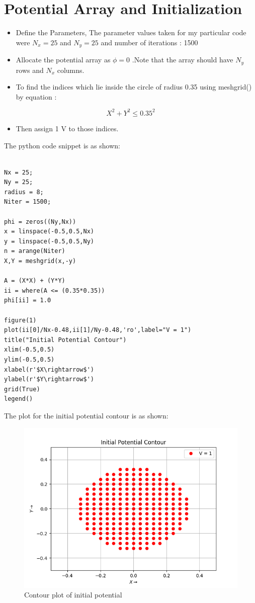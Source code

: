 \documentclass[11pt, a4paper]{article}
\begin{document}
  \section{Potential Array and Initialization}
  

\begin{itemize}
\item
  Define the Parameters, The parameter values taken for my particular code 		  were \(N_x = 25\) and \(N_y = 25\) and number of iterations : 1500
\item
  Allocate the potential array as \(\phi = 0\) .Note that the array
  should have \(N_y\) rows and \(N_x\) columns.
\item
  To find the indices which lie inside the circle of radius 0.35 using
  meshgrid() by equation :
\end{itemize}

\begin{equation}
X ^2 +Y ^2 \leq	 0.35^2
\end{equation}

\begin{itemize}
\item
  Then assign 1 V to those indices.

\end{itemize}

The python code snippet is as shown:
\begin{verbatim}

Nx = 25; 
Ny = 25; 
radius = 8;
Niter = 1500; 
   
phi = zeros((Ny,Nx))
x = linspace(-0.5,0.5,Nx)
y = linspace(-0.5,0.5,Ny)
n = arange(Niter)
X,Y = meshgrid(x,-y)
  
A = (X*X) + (Y*Y)
ii = where(A <= (0.35*0.35))
phi[ii] = 1.0

figure(1)
plot(ii[0]/Nx-0.48,ii[1]/Ny-0.48,'ro',label="V = 1")
title("Initial Potential Contour")
xlim(-0.5,0.5)
ylim(-0.5,0.5)
xlabel(r'$X\rightarrow$')
ylabel(r'$Y\rightarrow$')
grid(True)
legend()  
       \end{verbatim}
       
The plot for the initial potential contour is as shown:
	     \begin{figure}[!tbh]
        \centering
        \includegraphics[scale=0.8]{Figure_1.png}  
        \caption{Contour plot of initial potential}
   \end{figure}
 	\newpage
\end{document}

